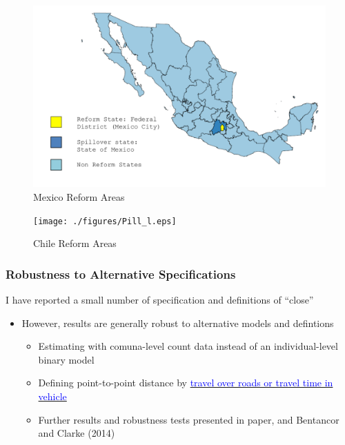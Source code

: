 \documentclass[10pt,letterpaper,subeqn]{beamer}
\begin{document}
\begin{frame}[label=MexMap]
\begin{figure}
\begin{center}
\caption{Mexico Reform Areas}
\hspace{-16mm}\includegraphics[scale=0.32]{./figures/MexReform.png}
\end{center}
\end{figure}
\end{frame}

\begin{frame}[label=ChileMap]
\begin{figure}
\begin{center}
\caption{Chile Reform Areas}
\hspace{-16mm}\texttt{[image: ./figures/Pill\_l.eps]}
\end{center}
\end{figure}
\end{frame}

\begin{frame}[label=robust]
 \frametitle{Robustness to Alternative Specifications}
I have reported a small number of specification and definitions of ``close''
\vspace{4mm}
\begin{itemize}
\item However, results are generally robust to alternative models and defintions
\begin{itemize}
\item Estimating with comuna-level count data instead of an individual-level binary model
\item Defining point-to-point distance by \hyperlink{distance}{\textcolor{blue}{travel over roads or travel time in vehicle}}
\item Further results and robustness tests presented in paper, and Bentancor and Clarke (2014)
\end{itemize}
\end{itemize}
\end{frame}
\end{document}
